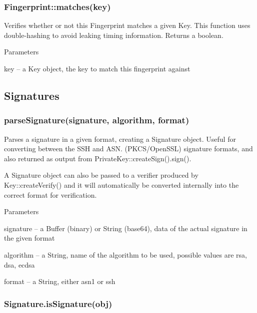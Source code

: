 \subsubsection*{{\ttfamily Fingerprint\+::matches(key)}}

Verifies whether or not this {\ttfamily Fingerprint} matches a given {\ttfamily Key}. This function uses double-\/hashing to avoid leaking timing information. Returns a boolean.

Parameters


\begin{DoxyItemize}
\item {\ttfamily key} -- a {\ttfamily Key} object, the key to match this fingerprint against
\end{DoxyItemize}

\subsection*{Signatures}

\subsubsection*{{\ttfamily parse\+Signature(signature, algorithm, format)}}

Parses a signature in a given format, creating a {\ttfamily Signature} object. Useful for converting between the S\+SH and A\+S\+N. (P\+K\+C\+S/\+Open\+S\+SL) signature formats, and also returned as output from {\ttfamily Private\+Key\+::create\+Sign().sign()}.

A Signature object can also be passed to a verifier produced by {\ttfamily Key\+::create\+Verify()} and it will automatically be converted internally into the correct format for verification.

Parameters


\begin{DoxyItemize}
\item {\ttfamily signature} -- a Buffer (binary) or String (base64), data of the actual signature in the given format
\item {\ttfamily algorithm} -- a String, name of the algorithm to be used, possible values are {\ttfamily rsa}, {\ttfamily dsa}, {\ttfamily ecdsa}
\item {\ttfamily format} -- a String, either {\ttfamily asn1} or {\ttfamily ssh}
\end{DoxyItemize}

\subsubsection*{{\ttfamily Signature.\+is\+Signature(obj)}}

